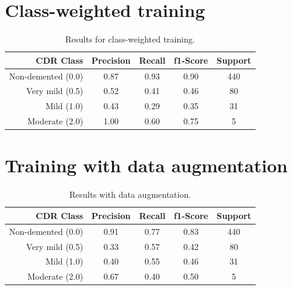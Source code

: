 \documentclass{kththesis}
\begin{document}
\section{Class-weighted training}
\begin{table}[H]
  \begin{center}
    \caption{Results for class-weighted training. \label{tab:results_class_weighted}}
    \begin{tabular}{r|ccc|c}
      \textbf{CDR Class} & \textbf{Precision} & \textbf{Recall} & \textbf{f1-Score} & \textbf{Support} \\
      \toprule
      Non-demented (0.0) & 0.87 & 0.93 & 0.90 & 440 \\
      Very mild (0.5)    & 0.52 & 0.41 & 0.46 & 80  \\
      Mild (1.0)         & 0.43 & 0.29 & 0.35 & 31  \\
      Moderate (2.0)     & 1.00 & 0.60 & 0.75 & 5   \\
    \end{tabular}
  \end{center}
\end{table}


\section{Training with data augmentation}
\begin{table}[H]
  \begin{center}
    \caption{Results with data augmentation. \label{tab:results_data_augmentation}}
    \begin{tabular}{r|ccc|c}
      \textbf{CDR Class} & \textbf{Precision} & \textbf{Recall} & \textbf{f1-Score} & \textbf{Support} \\
      \toprule
           Non-demented (0.0) &  0.91   &  0.77  &   0.83   &   440 \\
           Very mild (0.5)    &  0.33   &  0.57  &   0.42   &    80 \\
           Mild (1.0)         &  0.40   &  0.55  &   0.46   &    31 \\
           Moderate (2.0)     &  0.67   &  0.40  &   0.50   &     5 \\
    \end{tabular}
  \end{center}
\end{table}
\end{document}

